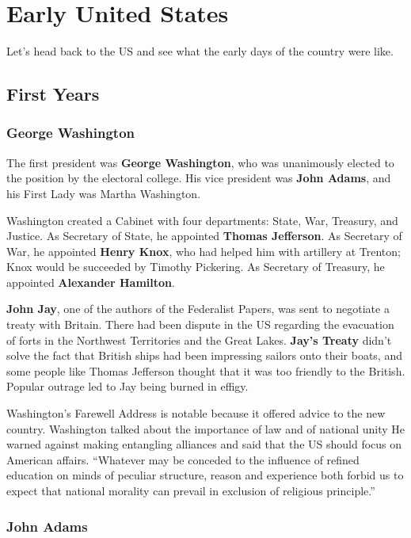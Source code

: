 \chapter{Early United States}

Let's head back to the US and see what the early days of the country were like.

\section{First Years}

\subsection*{George Washington}

The first president was \textbf{George Washington},
who was unanimously elected to the position by the electoral college.
His vice president was \textbf{John Adams},
and his First Lady was Martha Washington.

Washington created a Cabinet with four departments: State, War, Treasury, and Justice.
As Secretary of State, he appointed \textbf{Thomas Jefferson}.
As Secretary of War, he appointed \textbf{Henry Knox},
who had helped him with artillery at Trenton;
Knox would be succeeded by Timothy Pickering.
As Secretary of Treasury, he appointed \textbf{Alexander Hamilton}.

\textbf{John Jay}, one of the authors of the Federalist Papers, was sent to negotiate a treaty with Britain.
There had been dispute in the US regarding the evacuation of forts in the Northwest Territories and the Great Lakes.
\textbf{Jay's Treaty} didn't solve the fact that British ships had been impressing sailors onto their boats,
and some people like Thomas Jefferson thought that it was too friendly to the British.
Popular outrage led to Jay being burned in effigy.

Washington's Farewell Address is notable because it offered advice to the new country.
Washington talked about the importance of law and of national unity
He warned against making entangling alliances and said that the US should focus on American affairs.
``Whatever may be conceded to the influence of refined education on minds of peculiar structure,
reason and experience both forbid us to expect that national morality
can prevail in exclusion of religious principle.''

\subsection*{John Adams}

